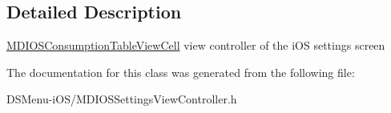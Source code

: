 \subsection{Detailed Description}
\hyperlink{interface_m_d_i_o_s_consumption_table_view_cell}{M\-D\-I\-O\-S\-Consumption\-Table\-View\-Cell} view controller of the i\-O\-S settings screen 

The documentation for this class was generated from the following file\-:\begin{DoxyCompactItemize}
\item 
D\-S\-Menu-\/i\-O\-S/M\-D\-I\-O\-S\-Settings\-View\-Controller.\-h\end{DoxyCompactItemize}

